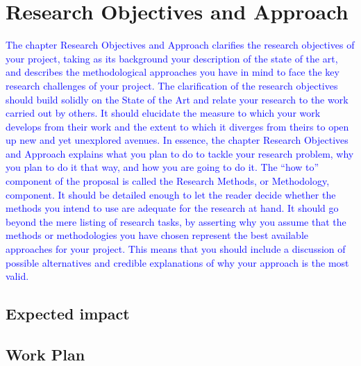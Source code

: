 \chapter{Research Objectives and Approach}
\label{ch:plan}


\textcolor{blue}{The chapter Research Objectives and Approach clarifies the research objectives of your 
project, taking as its background your description of the state of the art, and describes 
the methodological approaches you have in mind to face the key research challenges of 
your project. The clarification of the research objectives should build solidly on the 
State of the Art and relate your research to the work carried out by others. It should 
elucidate the measure to which your work develops from their work and the extent to 
which it diverges from theirs to open up new and yet unexplored avenues. In essence, 
the chapter Research Objectives and Approach explains what you plan to do to tackle 
your research problem, why you plan to do it that way, and how you are going to do it.  
The “how to” component of the proposal is called the Research Methods, or 
Methodology, component. It should be detailed enough to let the reader decide whether 
the methods you intend to use are adequate for the research at hand. It should go beyond 
the mere listing of research tasks, by asserting why you assume that the methods or 
methodologies you have chosen represent the best available approaches for your project. 
This means that you should include a discussion of possible alternatives and credible 
explanations of why your approach is the most valid. }


\section{Expected impact}
\label{sec:impact}



\section{Work Plan} 
\label{sec:workplan}





